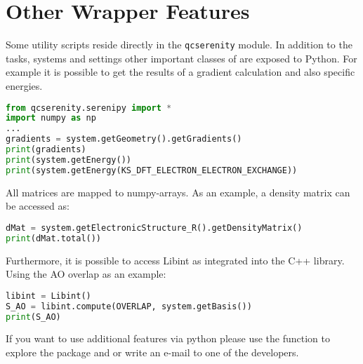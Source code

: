 \section{Other Wrapper Features}
Some utility scripts reside directly in the \texttt{qcserenity} module.
In addition to the tasks, systems and settings other important classes of \serenity are exposed to Python.
For example it is possible to get the results of a gradient calculation and also specific energies.
\begin{lstlisting}[language=Python]
from qcserenity.serenipy import *
import numpy as np
...
gradients = system.getGeometry().getGradients()
print(gradients)
print(system.getEnergy())
print(system.getEnergy(KS_DFT_ELECTRON_ELECTRON_EXCHANGE))
\end{lstlisting}
All matrices are mapped to numpy-arrays.
As an example, a density matrix can be accessed as:
\begin{lstlisting}[language=Python]
dMat = system.getElectronicStructure_R().getDensityMatrix()
print(dMat.total())
\end{lstlisting}
Furthermore, it is possible to access Libint as integrated into the C++ library.
Using the AO overlap as an example:
\begin{lstlisting}[language=Python]
libint = Libint()
S_AO = libint.compute(OVERLAP, system.getBasis())
print(S_AO)
\end{lstlisting}
If you want to use additional features via python please use the  function to explore the package
and or write an e-mail to one of the developers.
